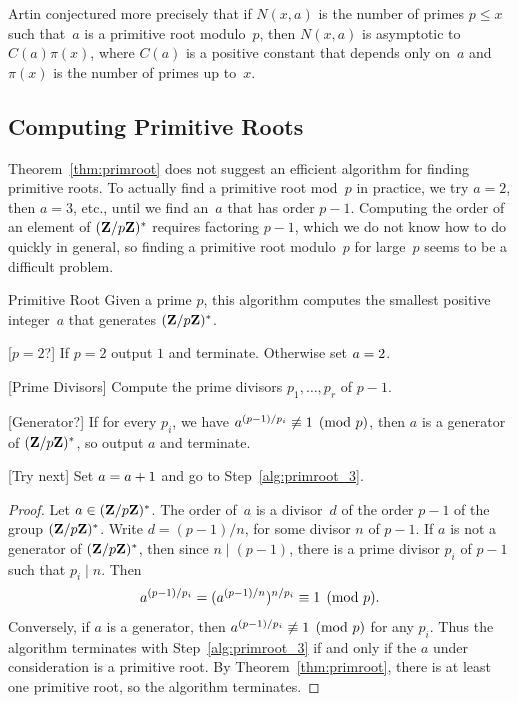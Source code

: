\begin{remark}
Artin conjectured more precisely that if $N(x,a)$ is the number of
primes $p\leq x$ such that~$a$ is a primitive root modulo~$p$, then
$N(x,a)$ is asymptotic to $C(a)\pi(x)$, where $C(a)$ is a positive
constant that depends only on~$a$ and $\pi(x)$ is the number of primes
up to~$x$.
\end{remark}

\subsection{Computing Primitive Roots}
Theorem~\ref{thm:primroot} does not suggest an efficient algorithm
for finding primitive roots.  To actually find a primitive root mod~$p$
in practice, we try $a=2$, then $a=3$, etc., until we find an~$a$
that has order $p-1$.  Computing the order of an element of $(\mathbf{Z}/p\mathbf{Z}{})^*$
requires factoring $p-1$, which we do not know how to do quickly in
general, so finding a primitive root modulo~$p$ for large~$p$ seems to
be a difficult problem.

\begin{algorithm}{Primitive Root}\label{alg:primitive_root}
Given a prime $p$, this algorithm computes the smallest positive
integer~$a$ that generates $(\mathbf{Z}/p\mathbf{Z}{})^*$.
\begin{steps}
\item{}[$p=2$?] If $p=2$ output $1$ and terminate.
Otherwise set $a= 2$.
\item{}[Prime Divisors] Compute the prime divisors $p_1, \ldots, p_r$
of $p-1$.
\item{}[Generator?] \label{alg:primroot_3}
If for every $p_i$, we have $a^{(p-1)/p_i} \not\equiv 1\pmod{p}$,
then $a$ is a generator of $(\mathbf{Z}/p\mathbf{Z}{})^*$, so output $a$ and terminate.
\item{}[Try next] Set $a= a+1$ and go to Step~\ref{alg:primroot_3}.
\end{steps}
\end{algorithm}
\begin{proof}
Let $a\in (\mathbf{Z}/p\mathbf{Z}{})^*$.
The order of~$a$ is a divisor~$d$ of
the order $p-1$ of the group $(\mathbf{Z}/p\mathbf{Z}{})^*$.
Write $d =(p-1)/n$, for some divisor $n$ of $p-1$.
If $a$ is not a generator of $(\mathbf{Z}/p\mathbf{Z}{})^*$, then
since $n\mid (p-1)$,  there is a prime divisor
$p_i$ of $p-1$ such that $p_i\mid n$.
Then $$a^{(p-1)/p_i} = (a^{(p-1)/n})^{n/p_i} \equiv 1\pmod{p}.$$
Conversely, if $a$ is a generator, then $a^{(p-1)/p_i}\not\equiv 1\pmod{p}$
for any $p_i$.  Thus the algorithm terminates with Step~\ref{alg:primroot_3}
if and only if the $a$ under consideration is a primitive root.
By Theorem~\ref{thm:primroot}, there is at least one primitive
root, so the algorithm terminates.
\end{proof}

